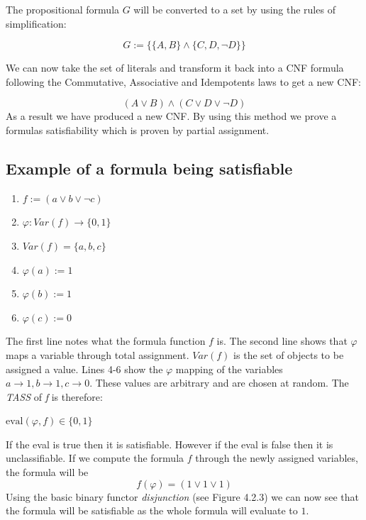\documentclass[11pt,a4paper]{report}
\begin{document}
The propositional formula $G$ will be converted to a set by using the rules of simplification:

\begin{displaymath}
 G := \{\{{{A,B}\} \land \{{C,D,\neg D}}\}\}
\end{displaymath}

We can now take the set of literals and transform it back into a CNF formula following the Commutative, Associative and Idempotents laws to get a new CNF:

\begin{displaymath}
(A \lor B) \land (C \lor D \lor \neg D)
\end{displaymath}
As a result we have produced a new CNF. By using this method we prove a formulas satisfiability which is proven by partial assignment. 


\subsection{Example of a formula being satisfiable}

\begin{enumerate}
\item $f:= (a \lor b \lor \neg c)$
\item $\varphi: Var (f) \rightarrow \{0,1\}$
\item $Var (f) = \{a,b,c\}$
\item $\varphi(a):= 1$
\item $\varphi(b):= 1$
\item $\varphi(c):= 0$
\end{enumerate}

The first line notes what the formula function $f$ is. The second line shows that $\varphi$ maps a variable through total assignment. $Var(f)$ is the set of objects to be assigned a value. Lines 4-6 show the $\varphi$ mapping of the variables $a \rightarrow 1, b \rightarrow 1, c \rightarrow 0$. These values are arbitrary and are chosen at random. 
The \textit{TASS} of \textit{f} is therefore: 

\begin{center}
$\text{eval} (\varphi, f) \in \{0,1\}$
\end{center}
If the eval is true then it is satisfiable. However if the eval is false then it is unclassifiable. 
If we compute the formula $f$ through the newly assigned variables, the formula will be
\begin{displaymath}
f(\varphi) = (1 \lor 1 \lor 1)
\end{displaymath}
Using the basic binary functor \emph{disjunction} (see Figure 4.2.3) we can now see that the formula will be satisfiable as the whole formula will evaluate to $1$.
\end{document}
